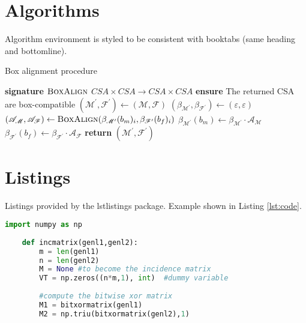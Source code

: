 \section{Algorithms}
Algorithm environment is styled to be consistent with booktabs (same heading and bottomline). \blindtext[2]
\begin{algorithm}
    \caption{Box alignment procedure}\label{alg:padding}
    \begin{algorithmic}[1]
        \Statex \textbf{signature} $\textsc{BoxAlign}$ $CSA\times CSA \to CSA\times CSA$
        \Statex \textbf{ensure} The returned CSA are box-compatible
            \State $(\mathscr{M}^\prime,\mathscr{F}^\prime)\gets(\mathscr{M},\mathscr{F})$
                \State $\left(\beta_{\mathscr{M}^\prime},\beta_{\mathscr{F}^\prime}\right)\gets(\varepsilon,\varepsilon)$
                    \State $(\mathscr{A}_\mathscr{M},\mathscr{A}_\mathscr{F})\gets\textsc{BoxAlign}(\beta_{\mathscr{M}^\prime}(b_m)_i,\beta_{\mathscr{F}^\prime}(b_f)_i)$
                    \State $\beta_{\mathscr{M}^\prime}(b_m)\gets\beta_{\mathscr{M}^\prime}\cdot\mathscr{A}_\mathscr{M}$
                    \State $\beta_{\mathscr{F}^\prime}(b_f)\gets\beta_{\mathscr{F}^\prime}\cdot\mathscr{A}_\mathscr{F}$
                \EndFor
            \EndFor
            \State \textbf{return} $(\mathscr{M}^\prime,\mathscr{F}^\prime)$
        \EndFunction
    \end{algorithmic}
\end{algorithm}


\section{Listings}
Listings provided by the lstlistings package. Example shown in Listing \ref{lst:code}. \blindtext[2]
\begin{lstlisting}[language=Python,float,caption=Python example,label={lst:code},basicstyle=\ttfamily,frame=b,framextopmargin=.2ex]
    import numpy as np
     
    def incmatrix(genl1,genl2):
        m = len(genl1)
        n = len(genl2)
        M = None #to become the incidence matrix
        VT = np.zeros((n*m,1), int)  #dummy variable
     
        #compute the bitwise xor matrix
        M1 = bitxormatrix(genl1)
        M2 = np.triu(bitxormatrix(genl2),1) 
\end{lstlisting}



